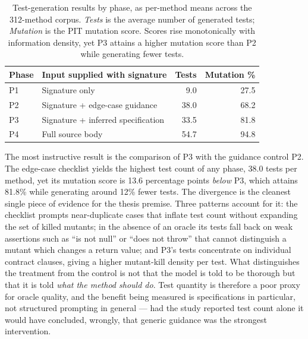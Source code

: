 \begin{table}[ht]
\centering
\caption{Test-generation results by phase, as per-method means across the 312-method
corpus. \emph{Tests} is the average number of generated tests; \emph{Mutation} is
the PIT mutation score. Scores rise monotonically with information density, yet P3
attains a higher mutation score than P2 while generating fewer tests.}
\label{tab:inf-phases}
\begin{tabular}{llrr}
\toprule
\textbf{Phase} & \textbf{Input supplied with signature} & \textbf{Tests} & \textbf{Mutation \%} \\
\midrule
P1 & Signature only                    &  9.0 & 27.5 \\
P2 & Signature + edge-case guidance    & 38.0 & 68.2 \\
P3 & Signature + inferred specification & 33.5 & 81.8 \\
P4 & Full source body                  & 54.7 & 94.8 \\
\bottomrule
\end{tabular}
\end{table}

The most instructive result is the comparison of P3 with the guidance control P2.
The edge-case checklist yields the highest test count of any phase, 38.0 tests per
method, yet its mutation score is 13.6 percentage points \emph{below} P3, which
attains 81.8\% while generating around 12\% fewer tests. The divergence is the
cleanest single piece of evidence for the thesis premise. Three patterns account
for it: the checklist prompts near-duplicate cases that inflate test count without
expanding the set of killed mutants; in the absence of an oracle its tests fall back
on weak assertions such as ``is not null'' or ``does not throw'' that cannot
distinguish a mutant which changes a return value; and P3's tests concentrate on
individual contract clauses, giving a higher mutant-kill density per test. What
distinguishes the treatment from the control is not that the model is told to be
thorough but that it is told \emph{what the method should do}. Test quantity is
therefore a poor proxy for oracle quality, and the benefit being measured is
specifications in particular, not structured prompting in general --- had the study
reported test count alone it would have concluded, wrongly, that generic guidance
was the strongest intervention.

